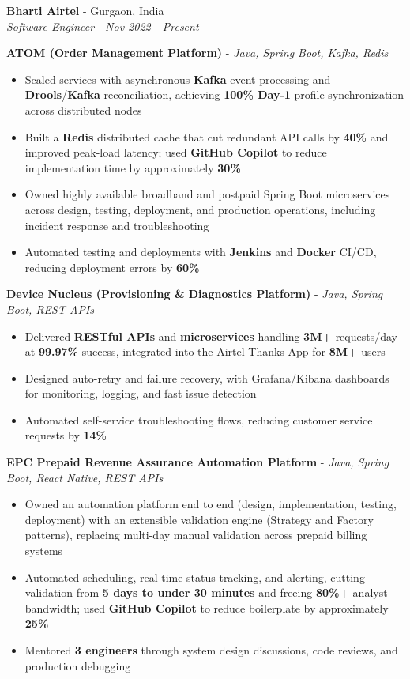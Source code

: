 \documentclass[letterpaper,10pt]{article}
\newcommand{\resumeItem}[1]{
  \item\small{{#1 \vspace{-2pt}}}
}
\newcommand{\resumeSubheading}[4]{
  \vspace{-2pt}\item
    \textbf{#1} - #2 \\
    \textit{\small #3} - \textit{\small #4}\vspace{-7pt}
}
\newcommand{\resumeItemListStart}{\begin{itemize}[itemsep=0pt,topsep=2pt,parsep=0pt]}
\newcommand{\resumeItemListEnd}{\end{itemize}\vspace{-5pt}}
\begin{document}
    \resumeSubheading
      {Bharti Airtel}{Gurgaon, India}
      {Software Engineer}{Nov 2022 - Present}

      \vspace{4pt}
      \textbf{\small ATOM (Order Management Platform)} - \textit{\small Java, Spring Boot, Kafka, Redis} \\
      \vspace{-2pt}
      \resumeItemListStart
        \resumeItem{Scaled services with asynchronous \textbf{Kafka} event processing and \textbf{Drools}/\textbf{Kafka} reconciliation, achieving \textbf{100\% Day-1} profile synchronization across distributed nodes}
        \resumeItem{Built a \textbf{Redis} distributed cache that cut redundant API calls by \textbf{40\%} and improved peak-load latency; used \textbf{GitHub Copilot} to reduce implementation time by approximately \textbf{30\%}}
        \resumeItem{Owned highly available broadband and postpaid Spring Boot microservices across design, testing, deployment, and production operations, including incident response and troubleshooting}
        \resumeItem{Automated testing and deployments with \textbf{Jenkins} and \textbf{Docker} CI/CD, reducing deployment errors by \textbf{60\%}}
      \resumeItemListEnd

      \vspace{2pt}
      \textbf{\small Device Nucleus (Provisioning \& Diagnostics Platform)} - \textit{\small Java, Spring Boot, REST APIs} \\
      \vspace{-2pt}
      \resumeItemListStart
        \resumeItem{Delivered \textbf{RESTful APIs} and \textbf{microservices} handling \textbf{3M+} requests/day at \textbf{99.97\%} success, integrated into the Airtel Thanks App for \textbf{8M+} users}
        \resumeItem{Designed auto-retry and failure recovery, with Grafana/Kibana dashboards for monitoring, logging, and fast issue detection}
        \resumeItem{Automated self-service troubleshooting flows, reducing customer service requests by \textbf{14\%}}
      \resumeItemListEnd

      \vspace{2pt}
      \textbf{\small EPC Prepaid Revenue Assurance Automation Platform} - \textit{\small Java, Spring Boot, React Native, REST APIs} \\
      \vspace{-2pt}
      \resumeItemListStart
        \resumeItem{Owned an automation platform end to end (design, implementation, testing, deployment) with an extensible validation engine (Strategy and Factory patterns), replacing multi-day manual validation across prepaid billing systems}
        \resumeItem{Automated scheduling, real-time status tracking, and alerting, cutting validation from \textbf{5 days to under 30 minutes} and freeing \textbf{80\%+} analyst bandwidth; used \textbf{GitHub Copilot} to reduce boilerplate by approximately \textbf{25\%}}
        \resumeItem{Mentored \textbf{3 engineers} through system design discussions, code reviews, and production debugging}
      \resumeItemListEnd
\end{document}

